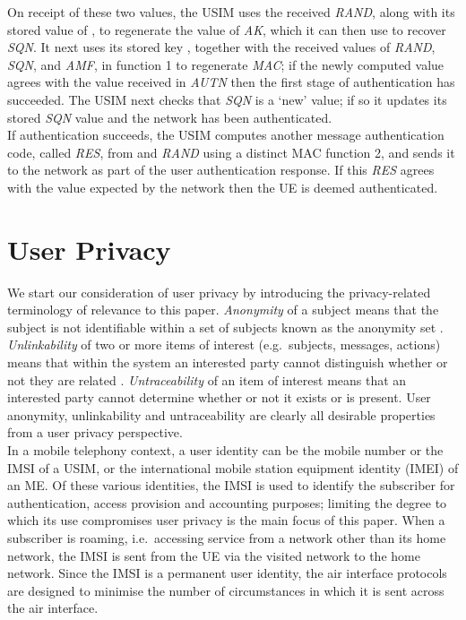 \documentclass{acm_proc_article-sp}
\begin{document}
On receipt of these two values, the USIM uses the received
\emph{RAND}, along with its stored value of , to regenerate the
value of \emph{AK}, which it can then use to recover \emph{SQN}\@.
It next uses its stored key , together with the received values
of \emph{RAND}, \emph{SQN}, and \emph{AMF}, in function 1 to regenerate \emph{MAC}; if the newly computed value agrees with the value
received in \emph{AUTN} then the first stage of authentication has
succeeded. The USIM next checks that \emph{SQN} is a `new' value; if
so it updates its stored \emph{SQN} value and the network has been
authenticated. \\

If authentication succeeds, the USIM computes another message
authentication code, called \emph{RES}, from  and \emph{RAND}
using a distinct MAC function 2, and sends it to the network as
part of the user authentication response. If this \emph{RES} agrees
with the value expected by the network then the UE is deemed
authenticated.


\section{User Privacy} \label{User-Privacy}

We start our consideration of user privacy by introducing the privacy-related terminology of relevance to this paper. \emph{Anonymity} of a subject means that the subject is not identifiable within a set of subjects known as the anonymity set \cite{Privacy-Term_Hansen_2012}. \emph{Unlinkability} of two or more items of interest (e.g.\ subjects, messages, actions) means that within the system an interested party cannot distinguish whether or not they are related \cite{Privacy-Term_Hansen_2012}. \emph{Untraceability} of an item of interest means that an interested party cannot determine whether or not it exists or is present. User anonymity, unlinkability and untraceability are clearly all desirable properties from a user privacy perspective.  \\

In a mobile telephony context, a user identity can be the mobile number or the IMSI of a USIM, or the international mobile station equipment identity (IMEI) of an ME\@. Of these various identities, the IMSI is used to identify the subscriber for authentication, access provision and accounting purposes; limiting the degree to which its use compromises user privacy is the main focus of this paper. When a subscriber is roaming, i.e.\ accessing service from a network other than its home network, the IMSI is sent from the UE via the visited network to the home network. Since the IMSI is a permanent user identity, the air interface protocols are designed to minimise the number of circumstances in which it is sent across the air interface. \\
\end{document}
